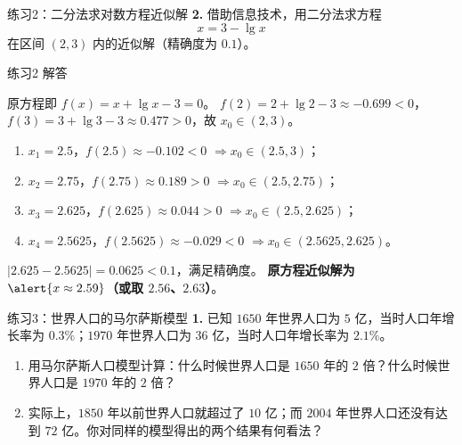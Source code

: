 \documentclass[10pt,aspectratio=169,serif]{beamer}
\begin{document}
\begin{frame}[t]{练习2：二分法求对数方程近似解}
\textbf{2.} 借助信息技术，用二分法求方程
\[
x=3-\lg x
\]
在区间 $(2,3)$ 内的近似解（精确度为 $0.1$）。
\end{frame}

\begin{frame}[t]{练习2 解答}
\vspace{-1em}
\begin{tcolorbox}[colback=orange!10,colframe=orange,title=\textbf{解}]
原方程即 $f(x)=x+\lg x-3=0$。
$f(2)=2+\lg 2-3\approx -0.699<0$，$f(3)=3+\lg 3-3\approx 0.477>0$，故 $x_{0}\in(2,3)$。
\smallskip
\begin{enumerate}
  \item $x_{1}=2.5$，$f(2.5)\approx -0.102<0$ $\Rightarrow x_{0}\in(2.5,3)$；
  \item $x_{2}=2.75$，$f(2.75)\approx 0.189>0$ $\Rightarrow x_{0}\in(2.5,2.75)$；
  \item $x_{3}=2.625$，$f(2.625)\approx 0.044>0$ $\Rightarrow x_{0}\in(2.5,2.625)$；
  \item $x_{4}=2.5625$，$f(2.5625)\approx -0.029<0$ $\Rightarrow x_{0}\in(2.5625,2.625)$。
\end{enumerate}
$|2.625-2.5625|=0.0625<0.1$，满足精确度。
\smallskip
\textbf{原方程近似解为 } $\alert{x\approx 2.59}$\textbf{（或取 $2.56$、$2.63$）}。
\end{tcolorbox}
\end{frame}

\begin{frame}[t]{练习3：世界人口的马尔萨斯模型}
\textbf{1.} 已知 $1650$ 年世界人口为 $5$ 亿，当时人口年增长率为 $0.3\%$；$1970$ 年世界人口为 $36$ 亿，当时人口年增长率为 $2.1\%$。
\begin{enumerate}
  \item 用马尔萨斯人口模型计算：什么时候世界人口是 $1650$ 年的 $2$ 倍？什么时候世界人口是 $1970$ 年的 $2$ 倍？
  \item 实际上，$1850$ 年以前世界人口就超过了 $10$ 亿；而 $2004$ 年世界人口还没有达到 $72$ 亿。你对同样的模型得出的两个结果有何看法？
\end{enumerate}
\end{frame}
\end{document}
